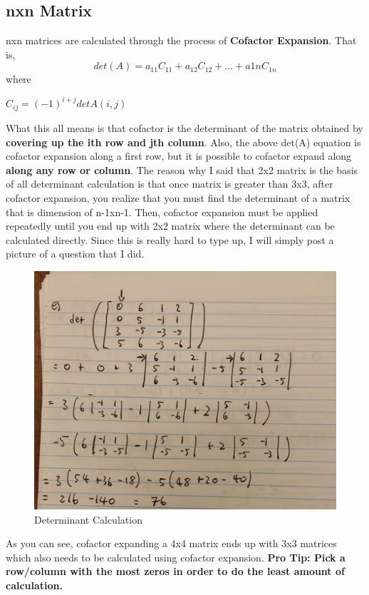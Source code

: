 \documentclass[12pt]{article}
\begin{document}
\subsection{nxn Matrix}
nxn matrices are calculated through the process of \textbf{Cofactor Expansion}.
That is, 
\begin{equation}
det(A) = a_{11}C_{11} + a_{12}C_{12}+...+a{1n}C_{1n}
\end{equation}
where\\
\begin{center}
$C_{ij} = (-1)^{i+j}detA(i,j)$
\end{center}
What this all means is that cofactor is the determinant of the matrix obtained by \textbf{covering up the ith row and jth column}.
Also, the above det(A) equation is cofactor expansion along a first row, but it is possible to cofactor expand along \textbf{along any row or column}.
The reason why I said that 2x2 matrix is the basis of all determinant calculation is that once matrix is greater than 3x3, after cofactor expansion, you realize that you must find the determinant of a matrix that is dimension of n-1xn-1. Then, cofactor expansion must be applied repeatedly until you end up with 2x2 matrix where the determinant can be calculated directly. Since this is really hard to type up, I will simply post a picture of a question that I did.
\begin{figure}[!htb]
      	\centering
      	\includegraphics[scale=0.6]{determinant.png}
      	\caption{Determinant Calculation \label{fig:Determinant}}
\end{figure}
As you can see, cofactor expanding a 4x4 matrix ends up with 3x3 matrices which also needs to be calculated using cofactor expansion.
\textbf{Pro Tip: Pick a row/column with the most zeros in order to do the least amount of calculation.}
\end{document}
